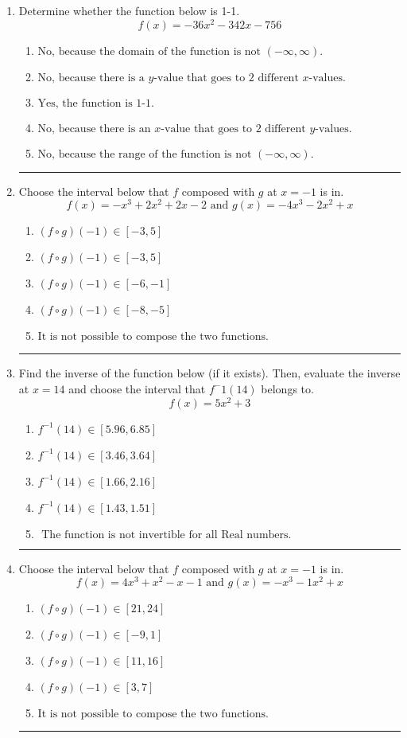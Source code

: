 \documentclass[14pt]{extbook}
\newcommand{\litem}[1]{\item#1\hspace*{-1cm}\rule{\textwidth}{0.4pt}}
\begin{document}
\begin{enumerate}
{\begin{enumerate}[label=\Alph*.]
\end{enumerate} }
\litem{
Determine whether the function below is 1-1.\[ f(x) = -36 x^2 - 342 x - 756 \]\begin{enumerate}[label=\Alph*.]
\item \( \text{No, because the domain of the function is not $(-\infty, \infty)$.} \)
\item \( \text{No, because there is a $y$-value that goes to 2 different $x$-values.} \)
\item \( \text{Yes, the function is 1-1.} \)
\item \( \text{No, because there is an $x$-value that goes to 2 different $y$-values.} \)
\item \( \text{No, because the range of the function is not $(-\infty, \infty)$.} \)

\end{enumerate} }
\litem{
Choose the interval below that $f$ composed with $g$ at $x=-1$ is in.\[ f(x) = -x^{3} +2 x^{2} +2 x -2 \text{ and } g(x) = -4x^{3} -2 x^{2} +x \]\begin{enumerate}[label=\Alph*.]
\item \( (f \circ g)(-1) \in [-3, 5] \)
\item \( (f \circ g)(-1) \in [-3, 5] \)
\item \( (f \circ g)(-1) \in [-6, -1] \)
\item \( (f \circ g)(-1) \in [-8, -5] \)
\item \( \text{It is not possible to compose the two functions.} \)

\end{enumerate} }
\litem{
Find the inverse of the function below (if it exists). Then, evaluate the inverse at $x = 14$ and choose the interval that $f^-1(14)$ belongs to.\[ f(x) = 5 x^2 + 3 \]\begin{enumerate}[label=\Alph*.]
\item \( f^{-1}(14) \in [5.96, 6.85] \)
\item \( f^{-1}(14) \in [3.46, 3.64] \)
\item \( f^{-1}(14) \in [1.66, 2.16] \)
\item \( f^{-1}(14) \in [1.43, 1.51] \)
\item \( \text{ The function is not invertible for all Real numbers. } \)

\end{enumerate} }
\litem{
Choose the interval below that $f$ composed with $g$ at $x=-1$ is in.\[ f(x) = 4x^{3} + x^{2} -x -1 \text{ and } g(x) = -x^{3} -1 x^{2} +x \]\begin{enumerate}[label=\Alph*.]
\item \( (f \circ g)(-1) \in [21, 24] \)
\item \( (f \circ g)(-1) \in [-9, 1] \)
\item \( (f \circ g)(-1) \in [11, 16] \)
\item \( (f \circ g)(-1) \in [3, 7] \)
\item \( \text{It is not possible to compose the two functions.} \)


\end{enumerate}}
\end{enumerate}
\end{document}

